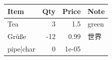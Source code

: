 \begin{tabular}{lrrl}
\hline
 Item      &   Qty &   Price & Note   \\
\hline
 Tea       &     3 &   1.5   & green  \\
 Grüße     &   -12 &   0.99  & 世界     \\
 pipe|char &     0 &   1e-05 &        \\
\hline
\end{tabular}
